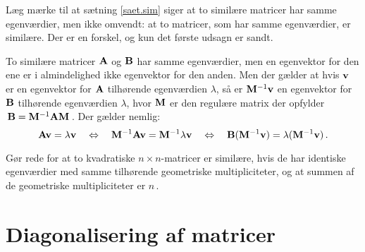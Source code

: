 
\begin{obs}
Læg mærke til at sætning \ref{saet.sim} siger at to similære matricer har samme egenværdier, men ikke omvendt: at to matricer, som har samme egenværdier, er similære. Der er en forskel, og kun det første udsagn er sandt.
\end{obs}

\begin{obs}
To similære matricer $ \mathbf{A} $ og $ \mathbf{B} $ har samme egenværdier, men en egenvektor for den ene er i almindelighed ikke egenvektor for den anden. Men der gælder at hvis $ \mathbf{v} $ er en egenvektor for $\mathbf{A}$ tilhørende egenværdien $ \lambda $, så er $\mathbf{M}^{-1}\mathbf{v}$ en egenvektor for $\mathbf{B}$ tilhørende egenværdien $ \lambda $, hvor $\mathbf{M}$ er den regulære matrix der opfylder $\,\mathbf{B} = \mathbf{M}^{-1} \mathbf{A} \mathbf{M}\,$. Der gælder nemlig:
\begin{equation}
\mathbf{A}\mathbf{v} = \lambda\mathbf{v} \quad  \Leftrightarrow \quad \mathbf{M}^{-1} \mathbf{A} \mathbf{v} = \mathbf{M}^{-1} \lambda \mathbf{v} \quad \Leftrightarrow \quad \mathbf{B} (\mathbf{M}^{-1} \mathbf{v}) = \lambda (\mathbf{M}^{-1} \mathbf{v}) \,.
\end{equation}
\end{obs}

\begin{exercise}
Gør rede for at to kvadratiske $n\times n$-matricer er similære, hvis de har identiske egenværdier med samme tilhørende geometriske multipliciteter, og at summen af de geometriske multipliciteter er $n\,$. 
\end{exercise}






\section{Diagonalisering af matricer}


